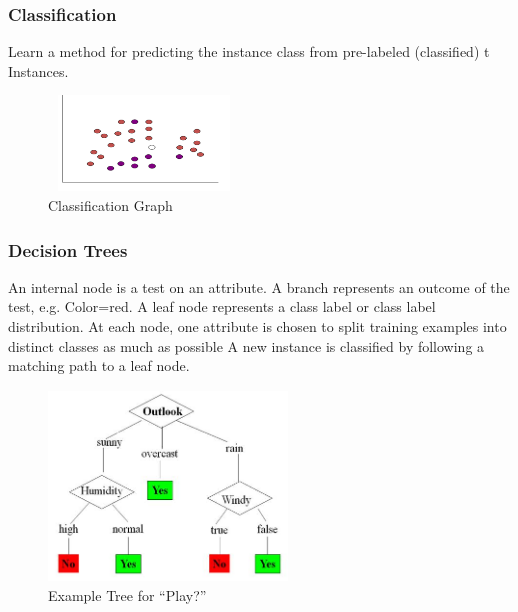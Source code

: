 \documentclass[a4paper,14pt,onecolumn]{article}
\begin{document}
\subsubsection{Classification }
Learn a method for predicting the instance class from pre-labeled (classified) t  Instances.

\begin{figure}[h]
\begin{center}
\includegraphics[height=1in,width=2in]
{classficationGraph.jpg}  
\caption{Classification Graph}
\end{center}
\end{figure} 

\subsubsection{Decision Trees  }
            An internal node is a test on an attribute. A branch represents an outcome of the test, e.g. Color=red. A leaf node represents a class label or class label distribution. At each node, one attribute is chosen to split training examples into distinct classes as much as possible A new instance is classified by following a matching path to a leaf node.

\begin{figure}
\begin{center}
\includegraphics[height=2in,width=2.5in]
{decisiontree.jpg}  
\caption{Example Tree for “Play?”}
\end{center}
\end{figure} 
\end{document}
